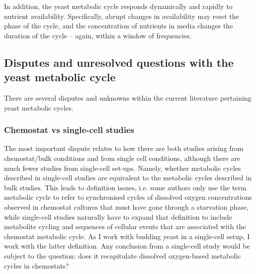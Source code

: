 In addition, the yeast metabolic cycle responds dynamically and rapidly to nutrient availability.
Specifically, abrupt changes in availability may reset the phase of the cycle, and the concentration of nutrients in media changes the duration of the cycle -- again, within a window of frequencies.


\subsection{Disputes and unresolved questions with the yeast metabolic cycle}
\label{subsec:intro-ymc-unresolved}

There are several disputes and unknowns within the current literature pertaining yeast metabolic cycles.

\subsubsection{Chemostat vs single-cell studies}
\label{subsubsec:intro-ymc-unresolved-chemostat_singlecell}

The most important dispute relates to how there are both studies arising from chemostat/bulk conditions and from single cell conditions,
although there are much fewer studies from single-cell set-ups.
Namely, whether metabolic cycles described in single-cell studies are equivalent to the metabolic cycles described in bulk studies.
This leads to definition issues, i.e. some authors \parencite{laxmanBehaviorMetabolicCycling2010, caustonMetabolicRhythmsFramework2018} only use the term metabolic cycle to refer to synchronised cycles of dissolved oxygen concentrations observed in chemostat cultures that must have gone through a starvation phase, while single-cell studies \parencite{baumgartnerFlavinbasedMetabolicCycles2018, zylstraMetabolicDynamicsCell2022} naturally have to expand that definition to include metabolite cycling and sequences of cellular events that are associated with the chemostat metabolic cycle.
As I work with budding yeast in a single-cell setup, I work with the latter definition.
Any conclusion from a single-cell study would be subject to the question: does it recapitulate dissolved oxygen-based metabolic cycles in chemostats?

